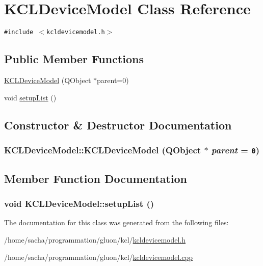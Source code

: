 \hypertarget{class_k_c_l_device_model}{
\section{KCLDeviceModel Class Reference}
\label{class_k_c_l_device_model}
}
{\tt \#include $<$kcldevicemodel.h$>$}

\subsection*{Public Member Functions}
\begin{CompactItemize}
\item 
\hyperlink{class_k_c_l_device_model_4015fbee857e468d75861e2aa13e5653}{KCLDeviceModel} (QObject $\ast$parent=0)
\item 
void \hyperlink{class_k_c_l_device_model_ed625ef5cc19fc60dfc92861b64d9656}{setupList} ()
\end{CompactItemize}


\subsection{Constructor \& Destructor Documentation}
\hypertarget{class_k_c_l_device_model_4015fbee857e468d75861e2aa13e5653}{
\subsubsection[{KCLDeviceModel}]{\setlength{\rightskip}{0pt plus 5cm}KCLDeviceModel::KCLDeviceModel (QObject $\ast$ {\em parent} = {\tt 0})}}
\label{class_k_c_l_device_model_4015fbee857e468d75861e2aa13e5653}




\subsection{Member Function Documentation}
\hypertarget{class_k_c_l_device_model_ed625ef5cc19fc60dfc92861b64d9656}{
\subsubsection[{setupList}]{\setlength{\rightskip}{0pt plus 5cm}void KCLDeviceModel::setupList ()}}
\label{class_k_c_l_device_model_ed625ef5cc19fc60dfc92861b64d9656}




The documentation for this class was generated from the following files:\begin{CompactItemize}
\item 
/home/sacha/programmation/gluon/kcl/\hyperlink{kcldevicemodel_8h}{kcldevicemodel.h}\item 
/home/sacha/programmation/gluon/kcl/\hyperlink{kcldevicemodel_8cpp}{kcldevicemodel.cpp}\end{CompactItemize}

